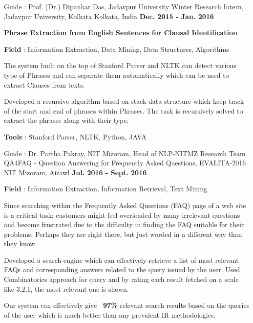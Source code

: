 \begin{cventries}
  \cventry
    {Guide : Prof. (Dr.) Dipankar Das, Jadavpur University}
    {Winter Research Intern, Jadavpur University, Kolkata}
    {Kolkata, India}
    {\textbf{Dec. 2015 - Jan. 2016}}
    {
      \begin{cvitems}
        \item\textbf {Phrase Extraction from English Sentences for Clausal Identification} 
        \item{\textbf{Field} : Information Extraction, Data Mining, Data Structures, Algorithms}
        \item{The system built on the top of Stanford Parser and NLTK can detect various type of Phrases and
 can separate them automatically which can be used to extract Clauses from texts.}
        \item{Developed a recursive algorithm
 based on stack data structure which keep track of the start and end of phrases within Phrases. The task
 is recursively solved to extract the phrases along with their type.}
        \item {\textbf{Tools} : Stanford Parser, NLTK, Python, JAVA}
      \end{cvitems}
    }
          \cventry
    {Guide : Dr. Partha Pakray, NIT Mizoram, Head of NLP-NITMZ Research Team}
    {QA4FAQ - Question Answering for Frequently Asked Questions, EVALITA-2016}
    {NIT Mizoram, Aizawl}
    {\textbf{Jul. 2016 - Sept. 2016}}
    {
      \begin{cvitems}
        \item{\textbf{Field} : Information Extraction, Information Retrieval, Text Mining}
        \item{Since searching within the Frequently Asked Questions (FAQ) page of a web site is a critical task: customers might feel overloaded by many irrelevant questions and become frustrated due to the difficulty in finding the FAQ suitable for their problems. Perhaps they are right there, but just worded in a different way than they know.}
        \item{Developed a search-engine which can effectively retrieve a list of most relevant FAQs and corresponding answers related to the query issued by the user. Used Combinatorics approach for query and by rating each result fetched on a scale like 3,2,1, the most relevant one is shown.}
        \item{Our system can effectively give \textbf{~97\%} relevant search results based on the queries of the user which is much better than any prevalent IR methodologies.}

\end{cvitems}}
\end{cventries}
